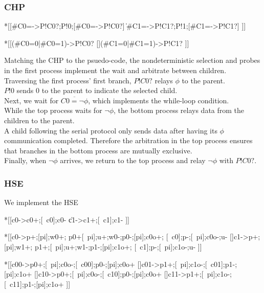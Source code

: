 \documentclass{article}
\begin{document}
\subsubsection*{CHP}

\begin{csp}
*[[#{C0=\phi}->P!C0?;P!0;[#{C0=\neg\phi}->P!C0?]
  \|#{C1=\phi}->P!C1?;P!1;[#{C1=\neg\phi}->P!C1?]
 ]]

*[[(#{C0=0}|#{C0=1})->P!C0?
  [](#{C1=0}|#{C1=1})->P!C1?
 ]]
\end{csp}

\noindent
Matching the CHP to the psuedo-code, the nondeterministic selection and 
probes in the first process implement the wait and arbitrate between children. \\
Traversing the first process' first branch, $P!C0?$ relays $\phi$ to the parent. \\
$P!0$ sends $0$ to the parent to indicate the selected child. \\
Next, we wait for $\overline{C0=\neg\phi}$, which implements the while-loop 
condition. \\
While the top process waits for $\neg\phi$, the bottom process relays 
data from the children to the parent. \\
A child following the serial protocol only sends data after having 
its $\phi$ communication completed. Therefore the arbitration in
the top process ensures that branches in the bottom process are mutually 
exclusive. \\
Finally, when $\neg\phi$ arrives, we return to the top process and relay
$\neg\phi$ with $P!C0?$. \\


\subsubsection*{HSE}

We implement the HSE

\begin{hse}
*[[c0\phi->c0+;[~c0\phi];c0-
  \|c1\phi->c1+;[~c1\phi];c1-
 ]]

*[[c0->p\phi+;[pi];w0+;
    p0+[~pi];u+;w0-;p0-;[pi];c0o+;
    [~c0];p\phi-;[~pi];c0o-;u-
  []c1->p\phi+;[pi];w1+;
    p1+;[~pi];u+;w1-;p1-;[pi];c1o+;
    [~c1];p\phi-;[~pi];c1o-;u-
 ]]
\end{hse}

\begin{hse}
*[[c00->p0+;[~pi];c0o-;[~c00];p0-;[pi];c0o+
  []c01->p1+;[~pi];c1o-;[~c01];p1-;[pi];c1o+
  []c10->p0+;[~pi];c0o-;[~c10];p0-;[pi];c0o+
  []c11->p1+;[~pi];c1o-;[~c11];p1-;[pi];c1o+
 ]]
\end{hse}
\end{document}
